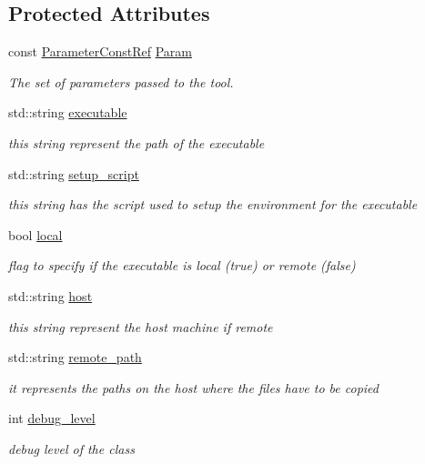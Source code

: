 \subsection*{Protected Attributes}
\begin{DoxyCompactItemize}
\item 
const \hyperlink{Parameter_8hpp_a37841774a6fcb479b597fdf8955eb4ea}{Parameter\+Const\+Ref} \hyperlink{classToolManager_ae9a9aa4672305bbf4ce1f28d4472b0eb}{Param}
\begin{DoxyCompactList}\small\item\em The set of parameters passed to the tool. \end{DoxyCompactList}\item 
std\+::string \hyperlink{classToolManager_afe1fc7588032f94a9aedc5d3840bcbb3}{executable}
\begin{DoxyCompactList}\small\item\em this string represent the path of the executable \end{DoxyCompactList}\item 
std\+::string \hyperlink{classToolManager_a21618f33c4d9a4da9ab3962c9a3af0bb}{setup\+\_\+script}
\begin{DoxyCompactList}\small\item\em this string has the script used to setup the environment for the executable \end{DoxyCompactList}\item 
bool \hyperlink{classToolManager_a3502f131211bdc34bc3b95e16abe8e3f}{local}
\begin{DoxyCompactList}\small\item\em flag to specify if the executable is local (true) or remote (false) \end{DoxyCompactList}\item 
std\+::string \hyperlink{classToolManager_a08d743e6d2aa5bfe5917130574d06a87}{host}
\begin{DoxyCompactList}\small\item\em this string represent the host machine if remote \end{DoxyCompactList}\item 
std\+::string \hyperlink{classToolManager_a01d51d439d7326cd32b06fe3c43f04ae}{remote\+\_\+path}
\begin{DoxyCompactList}\small\item\em it represents the paths on the host where the files have to be copied \end{DoxyCompactList}\item 
int \hyperlink{classToolManager_a747c92f90653a6135cf76b35fba2c40f}{debug\+\_\+level}
\begin{DoxyCompactList}\small\item\em debug level of the class \end{DoxyCompactList}\end{DoxyCompactItemize}


